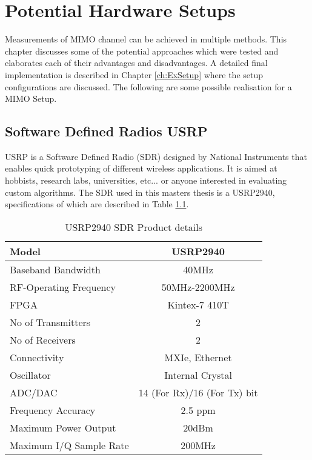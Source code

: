 \chapter{Potential Hardware Setups}
\label{ch:PotenHWSetup}

Measurements of MIMO channel can be achieved in multiple methods. This chapter discusses some of the potential approaches which were tested and elaborates each of their advantages and disadvantages. A detailed final implementation is described in Chapter \ref{ch:ExSetup} where the setup configurations are discussed. The following are some possible realisation for a MIMO Setup.

\section{Software Defined Radios USRP}\label{sec:USRP}

USRP is a Software Defined Radio (SDR) designed by National Instruments that enables quick prototyping of different wireless applications. It is aimed at hobbists, research labs, universities, etc... or anyone interested in evaluating custom algorithms. The SDR used in this masters thesis is a USRP2940, specifications of which are described in Table \ref{tb:USRP}.

\begin{table}[H]
    \begin{center}
        \begin{tabular}{|l|c|}
        \hline
            Model                   & USRP2940          \\ \hline
            Baseband Bandwidth      & 40MHz             \\ \hline
            RF-Operating Frequency  & 50MHz-2200MHz     \\ \hline
            FPGA                    & Kintex-7 410T     \\ \hline
            No of Transmitters      & 2                 \\ \hline
            No of Receivers         & 2                 \\ \hline
            Connectivity            & MXIe, Ethernet    \\ \hline
            Oscillator              & Internal Crystal  \\ \hline
            ADC/DAC                 & 14 (For Rx)/16 (For Tx) bit         \\ \hline
            Frequency Accuracy      & 2.5 ppm           \\ \hline
            Maximum Power Output    & 20dBm             \\ \hline
            Maximum I/Q Sample Rate & 200MHz            \\ \hline
        \end{tabular}
    \end{center}
    \caption{USRP2940 SDR Product details}
    \label{tb:USRP}
\end{table}

